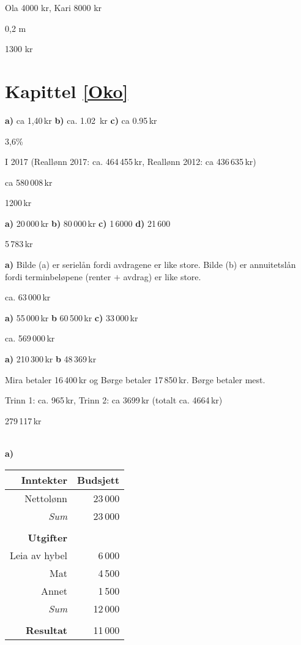  Ola 4000 kr, Kari 8000 kr

 0,2 m

 1300 kr

\section*{Kapittel \ref*{Oko}}\vs
{} \textbf{a)} ca 1,40\,kr \textbf{b)} ca. 1.02 \,kr \textbf{c)} ca 0.95\,kr

 3,6\%

 I 2017 (Reallønn 2017: ca. 464\,455\,kr, Reallønn 2012: ca 436\,635\,kr)

 ca 580\,008\,kr

 1200\,kr

 \textbf{a)} 20\,000\,kr \textbf{b)} 80\,000\,kr \textbf{c)} 1\,6000 \textbf{d)} 21\,600

 5\,783\,kr

\textbf{a)} Bilde (a) er serielån fordi avdragene er like store. Bilde (b) er annuitetslån fordi terminbeløpene (renter $ + $ avdrag) er like store.

 ca. 63\,000\,kr

 \textbf{a)} 55\,000\,kr \textbf{b} 60\,500\,kr \textbf{c)} 33\,000\,kr

 ca. 569\,000\,kr

 \textbf{a)} 210\,300\,kr \textbf{b} 48\,369\,kr

 Mira betaler 16\,400\,kr og Børge betaler 17\,850\,kr. Børge betaler mest.

 Trinn 1: ca. 965\,kr, Trinn 2: ca 3699\,kr (totalt ca. 4664\,kr)

 279\,117\,kr

\\
\textbf{a)}\\
\begin{tabular}{r r}
	\textbf{Inntekter} & Budsjett \\ \hline 
	Nettolønn & 23\,000 \\ \hline
	\textit{Sum} & 23\,000 \\ \hline \\
	\textbf{Utgifter} & \\ \hline
	Leia av hybel & 6\,000 \\
	Mat & 4\,500 \\
	Annet & 1\,500\\ \hline
	\textit{Sum} & 12\,000\\ \hline \\ \hline

	\textbf{Resultat} & 11\,000\\ \hline
\end{tabular}\vsk

